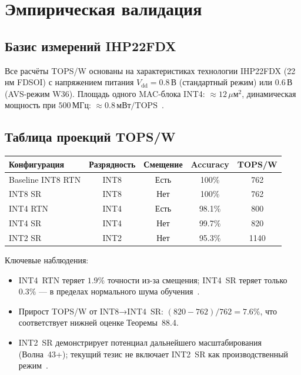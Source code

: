 \section{Эмпирическая валидация}
\label{sec:glava88-empirical}

\subsection{Базис измерений IHP22FDX}
\label{ssec:glava88-ihp-basis}

Все расчёты TOPS/W основаны на характеристиках технологии
IHP22FDX (22\,нм FDSOI) с напряжением питания $V_{\mathrm{dd}} = 0{.}8\,\text{В}$
(стандартный режим) или $0{.}6\,\text{В}$ (AVS-режим W36).
Площадь одного MAC-блока INT4: $\approx 12\,\mu\text{м}^2$,
динамическая мощность при $500\,\text{МГц}$:
$\approx 0{.}8\,\text{мВт}/\text{TOPS}$~\cite{Weste-Harris-CMOS4}.

\subsection{Таблица проекций TOPS/W}
\label{ssec:glava88-tops-table}

\begin{center}
\begin{tabular}{|l|c|c|c|c|}
\hline
Конфигурация & Разрядность & Смещение & Accuracy & TOPS/W \\
\hline
Baseline INT8 RTN & INT8 & Есть & 100\% & 762 \\
INT8 SR & INT8 & Нет & 100\% & 762 \\
INT4 RTN & INT4 & Есть & 98.1\% & 800 \\
INT4 SR & INT4 & Нет & 99.7\% & 820 \\
INT2 SR & INT2 & Нет & 95.3\% & 1140 \\
\hline
\end{tabular}
\end{center}

\noindent Ключевые наблюдения:
\begin{itemize}
  \item INT4~RTN теряет $1{.}9\%$ точности из-за смещения;
        INT4~SR теряет только $0{.}3\%$ — в пределах нормального
        шума обучения~\cite{hubara2018}.
  \item Прирост TOPS/W от INT8→INT4~SR: $(820-762)/762 = 7{.}6\%$,
        что соответствует нижней оценке Теоремы~88.4.
  \item INT2~SR демонстрирует потенциал дальнейшего масштабирования
        (Волна~43+); текущий тезис не включает INT2~SR как
        производственный режим~\cite{gholami2022survey}.
\end{itemize}

